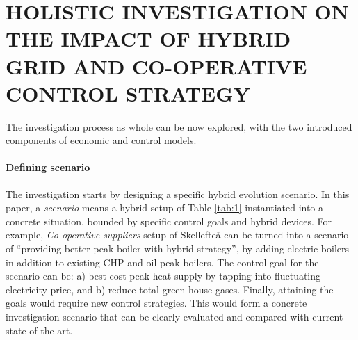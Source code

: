 \documentclass[review]{elsarticle}
\begin{document}

\section{\uppercase{Holistic Investigation on the Impact of Hybrid Grid and
  Co-operative Control Strategy}}
\label{sec:hol} 

The investigation process as whole can be now explored, with the two
introduced components of economic and control models.


\paragraph{Defining scenario} 
The investigation starts by designing a specific hybrid evolution
scenario. In this paper, a {\em scenario} means a hybrid setup of Table
\ref{tab:1} instantiated into a concrete situation, bounded by
specific control goals and hybrid devices. For example, {\em 
  Co-operative suppliers} setup of Skellefte{\aa} can be turned into a 
scenario of ``providing better peak-boiler with hybrid strategy'', by
adding electric boilers in addition to existing CHP and oil peak
boilers. The control goal for the scenario can be: a) best cost
peak-heat supply by tapping into fluctuating electricity price, and b)
reduce total green-house gases. Finally, attaining the goals would
require new control strategies.  
This would form a concrete investigation scenario that can be clearly
evaluated and compared with current state-of-the-art.  
\end{document}
